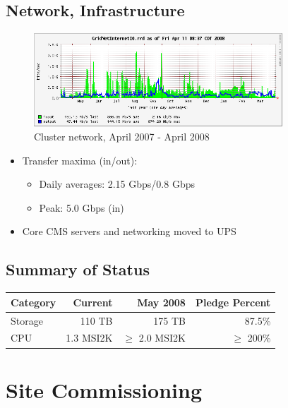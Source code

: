 \documentclass{beamer}
\begin{document}
\subsection{Network, Infrastructure}
\begin{frame}
\begin{figure}
    \includegraphics[height=3.5cm]{Graphics/gridnetio-1year.png}
    \caption{Cluster network, April 2007 - April 2008}
\end{figure}

\begin{itemize}
    \item Transfer maxima (in/out):
    \begin{itemize}
        \item Daily averages: 2.15 Gbps/0.8 Gbps
        \item Peak: 5.0 Gbps (in)
    \end{itemize}
    \item Core CMS servers and networking moved to UPS
\end{itemize}
\end{frame}

\subsection{Summary of Status}
\begin{frame}
\begin{table}
     \begin{tabular}{lrrr}
         \toprule
         Category    & Current       & May 2008      & Pledge Percent \\
         \midrule
         Storage     & 110 TB        & 175 TB        & 87.5\%\footnotemark[1] \\
         CPU         & 1.3 MSI2K     & $\geq$ 2.0 MSI2K & $\geq$ 200\% \\
         \bottomrule
     \end{tabular}
\end{table}
\end{frame}

\section{Site Commissioning}
\end{document}
